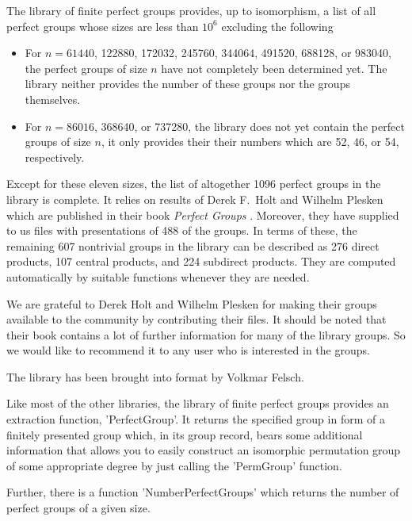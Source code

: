 The {\GAP} library of finite  perfect groups provides, up to isomorphism,
a list of all perfect groups whose sizes are less than  $10^6$  excluding
the following\:
\begin{itemize}
\item For $n = 61440$, 122880, 172032, 245760, 344064, 491520, 688128, or
      983040,  the perfect groups  of size  $n$  have not completely been
      determined yet.  The library  neither provides  the number of these
      groups nor the groups themselves. \vspace{-1mm}
\item For  $n = 86016$,  368640,  or  737280,  the library  does not  yet
      contain  the perfect groups  of size  $n$,  it  only provides their
      their numbers which are 52, 46, or 54, respectively.  \vspace{-2mm}
\end{itemize}

Except for these eleven sizes, the list of altogether 1096 perfect groups
in the library is  complete.  It relies  on results of Derek F.~Holt  and
Wilhelm  Plesken which are published  in  their book {\it Perfect Groups}
\cite{HP89}.  Moreover, they have supplied to us files with presentations
of  488 of the groups.  In terms of  these, the  remaining 607 nontrivial
groups in  the  library can  be   described as 276 direct   products, 107
central  products, and  224  subdirect    products.  They are    computed
automatically by suitable {\GAP} functions whenever they are needed.

We are grateful to Derek Holt and Wilhelm Plesken for making their groups
available to the {\GAP} community  by contributing their files. It should
be noted that  their book contains a  lot of further information for many
of the library groups.  So we would like  to recommend  it to any  {\GAP}
user who is interested in the groups.

The library has been brought into {\GAP} format by Volkmar Felsch.

Like most of  the other {\GAP}  libraries, the library of  finite perfect
groups provides  an  extraction function, 'PerfectGroup'. It  returns the
specified group in form of a finitely presented group which, in its group
record, bears  some additional  information   that allows  you  to easily
construct an isomorphic permutation group  of some appropriate degree  by
just calling the 'PermGroup' function.

Further, there is    a function 'NumberPerfectGroups'  which  returns the
number of perfect groups of a given size.

